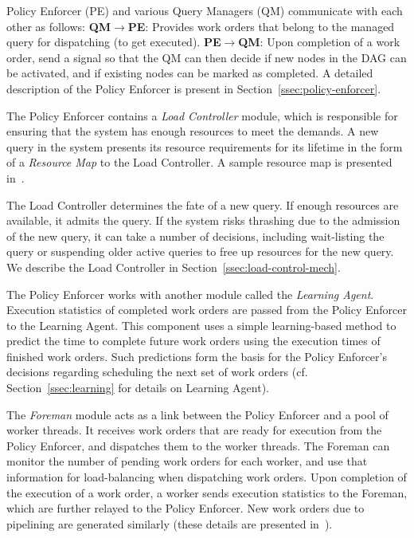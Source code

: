 Policy Enforcer (PE) and various Query Managers (QM) communicate with each other as follows:
\textbf{QM}$\rightarrow$\textbf{PE}: Provides work orders that belong to the managed query for dispatching (to get executed).
\textbf{PE}$\rightarrow$\textbf{QM}: Upon completion of a work order, send a signal so that the QM can then decide if new nodes in the DAG can be activated, and if existing nodes can be marked as completed.
A detailed description of the Policy Enforcer is present in Section~\ref{ssec:policy-enforcer}. 

The Policy Enforcer contains a \textit{Load Controller} module, which is
responsible for ensuring that the system has enough resources to meet the
demands.
A new query in the system presents its resource requirements for its lifetime in the form of a \textit{Resource Map} to the Load Controller.
A sample resource map is presented in~\cite{supplement}.

The Load Controller determines the fate of a new query. 
If enough resources are available, it admits the query.
If the system risks thrashing due to the admission of the new query, it can take a number of decisions, including wait-listing the query or suspending older active queries to free up resources for the new query.
We describe the Load Controller in Section~\ref{ssec:load-control-mech}.

The Policy Enforcer works with another module called the \textit{Learning Agent}. 
Execution statistics of completed work orders are passed from the Policy Enforcer to the Learning Agent.
This component uses a simple learning-based method to predict the time to 
complete future work orders using the execution times of finished work orders. 
Such predictions form the basis for the Policy Enforcer's decisions regarding scheduling the next set of work orders (cf. Section~\ref{ssec:learning} for details on Learning Agent).

The \textit{Foreman} module acts as a link between the Policy Enforcer and a pool of worker threads. 
It receives work orders that are ready for execution from the Policy Enforcer, and dispatches them to the worker threads. 
The Foreman can monitor the number of pending work orders for each worker, and 
use that information for load-balancing when dispatching work orders.
Upon completion of the execution of a work order, a worker sends execution statistics to the Foreman, which are further relayed to the Policy Enforcer.
New work orders due to pipelining are generated similarly (these details are presented in~\cite{supplement}).

